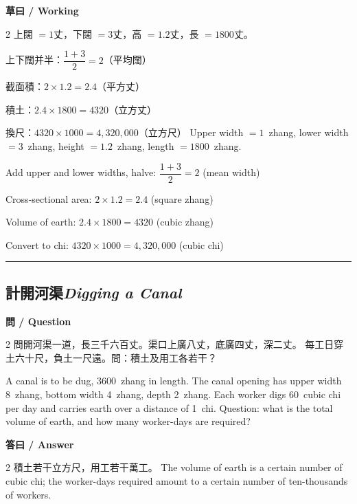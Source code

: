 \documentclass[11pt,a4paper]{article}
\newcommand{\bilingualsubsection}[2]{\subsection{#1\quad\textit{#2}}}
\newcommand{\longline}{\noindent\rule{\textwidth}{0.4pt}}
\begin{document}
\vspace{0.4em}
\noindent\textbf{\textcolor{chinesecolor}{草曰} / \textcolor{englishcolor}{Working}}
\vspace{0.2em}
\begin{paracol}{2}
上闊 $= 1$丈，下闊 $= 3$丈，高 $= 1.2$丈，長 $= 1800$丈。

上下闊并半：$\dfrac{1+3}{2} = 2$（平均闊）

截面積：$2 \times 1.2 = 2.4$（平方丈）

積土：$2.4 \times 1800 = 4320$（立方丈）

換尺：$4320 \times 1000 = 4{,}320{,}000$（立方尺）
\switchcolumn
Upper width $= 1$~zhang, lower width $= 3$~zhang, height $= 1.2$~zhang,
length $= 1800$~zhang.

Add upper and lower widths, halve: $\dfrac{1+3}{2} = 2$ (mean width)

Cross-sectional area: $2 \times 1.2 = 2.4$ (square zhang)

Volume of earth: $2.4 \times 1800 = 4320$ (cubic zhang)

Convert to chi: $4320 \times 1000 = 4{,}320{,}000$ (cubic chi)
\end{paracol}

\vspace{0.5em}
\longline

\bilingualsubsection{計開河渠}{Digging a Canal}

\vspace{0.4em}
\noindent\textbf{\textcolor{chinesecolor}{問} / \textcolor{englishcolor}{Question}}
\vspace{0.3em}
\begin{paracol}{2}
問開河渠一道，長三千六百丈。渠口上廣八丈，底廣四丈，深二丈。
每工日穿土六十尺，負土一尺遠。問：積土及用工各若干？
\switchcolumn

A canal is to be dug, 3600~zhang in length. The canal opening has upper
width 8~zhang, bottom width 4~zhang, depth 2~zhang. Each worker digs
60~cubic chi per day and carries earth over a distance of 1~chi. Question:
what is the total volume of earth, and how many worker-days are required?

\end{paracol}

\vspace{0.4em}
\noindent\textbf{\textcolor{chinesecolor}{答曰} / \textcolor{englishcolor}{Answer}}
\vspace{0.2em}
\begin{paracol}{2}
積土若干立方尺，用工若干萬工。
\switchcolumn
The volume of earth is a certain number of cubic chi; the worker-days
required amount to a certain number of ten-thousands of workers.
\end{paracol}
\end{document}
